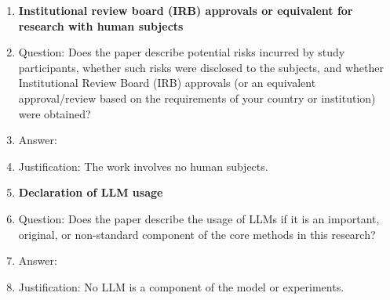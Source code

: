 \begin{enumerate}
\item \textbf{Institutional review board (IRB) approvals or equivalent for research with human subjects}
  \item[] Question: Does the paper describe potential risks incurred by study participants, whether such risks were disclosed to the subjects, and whether Institutional Review Board (IRB) approvals (or an equivalent approval/review based on the requirements of your country or institution) were obtained?
  \item[] Answer: \answerNA{}
  \item[] Justification: The work involves no human subjects.

\item \textbf{Declaration of LLM usage}
  \item[] Question: Does the paper describe the usage of LLMs if it is an important, original, or non-standard component of the core methods in this research?
  \item[] Answer: \answerNA{}
  \item[] Justification: No LLM is a component of the model or experiments.
\end{enumerate}
